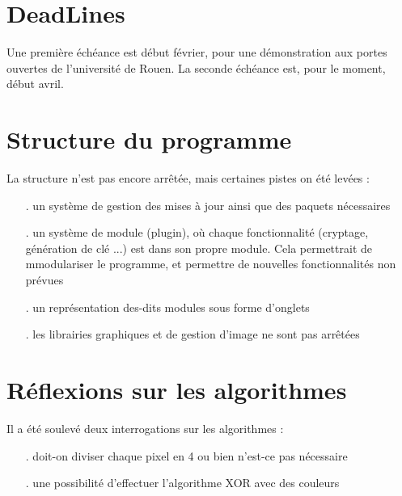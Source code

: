 \documentclass{report}
\begin{document}
\section*{DeadLines}
Une première échéance est début février, pour une démonstration aux portes ouvertes de l'université de Rouen.
La seconde échéance est, pour le moment, début avril.

\section*{Structure du programme}
La structure n'est pas encore arrêtée, mais certaines pistes on été levées :
\begin{itemize}
	\item[.] un système de gestion des mises à jour ainsi que des paquets nécessaires
	\item[.] un système de module (plugin), où chaque fonctionnalité (cryptage, génération de clé ...) est dans son propre module. Cela permettrait de mmodulariser le programme, et permettre de nouvelles fonctionnalités non prévues
	\item[.] un représentation des-dits modules sous forme d'onglets
	\item[.] les librairies graphiques et de gestion d'image ne sont pas arrêtées
\end{itemize}

\section*{Réflexions sur les algorithmes}
Il a été soulevé deux interrogations sur les algorithmes :
\begin{itemize}
	\item[.] doit-on diviser chaque pixel en 4 ou bien n'est-ce pas nécessaire
	\item[.] une possibilité d'effectuer l'algorithme XOR avec des couleurs
\end{itemize}
\end{document}

